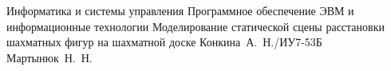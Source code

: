 \documentclass{bmstu}
\begin{document}
	\makecourseworktitle
	{Информатика и системы управления} 
	{Программное обеспечение ЭВМ и информационные технологии} 
	{Моделирование статической сцены расстановки шахматных фигур на шахматной доске} 
	{Конкина~А.~Н./ИУ7-53Б} 
	{Мартынюк~Н.~Н.} 
	{}
	
	\maketableofcontents
	
	
	
	
	
	
	
	\makebibliography
	
	
	
\end{document}
